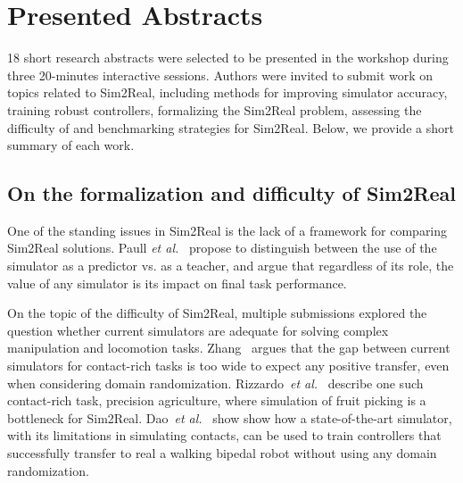 \section{Presented Abstracts}

18 short research abstracts were selected to be presented in the workshop during three 20-minutes interactive sessions. Authors were invited to submit work on topics related to Sim2Real, including methods for improving simulator accuracy, training robust controllers, formalizing the Sim2Real problem, assessing the difficulty of and benchmarking strategies for Sim2Real. Below, we provide a short summary of each work.

\subsection{On the formalization and difficulty of Sim2Real}
One of the standing issues in Sim2Real is the lack of a framework for comparing Sim2Real solutions. Paull \emph{et al.}~\cite{Paull:2020aa} propose to distinguish between the use of the simulator as a predictor vs. as a teacher, and argue that regardless of its role, the value of any simulator is its impact on final task performance.

On the topic of the difficulty of Sim2Real, multiple submissions explored the question whether current simulators are adequate for solving complex manipulation and locomotion tasks. Zhang~\cite{Zhang:2020aa} argues that the gap between current simulators for contact-rich tasks is too wide to expect any positive transfer, even when considering domain randomization. Rizzardo~\emph{et al.}~\cite{Rizzardo:2020aa} describe one such contact-rich task, precision agriculture, where simulation of fruit picking is a bottleneck for Sim2Real. Dao~\emph{et al.}~\cite{Dao:2020aa} show show how a state-of-the-art simulator, with its limitations in simulating contacts, can be used to train controllers that successfully transfer to real a walking bipedal robot without using any domain randomization.



